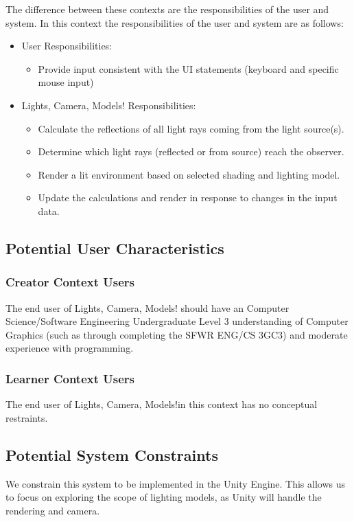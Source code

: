 \documentclass[12pt]{article}
\newcommand{\famname}{Lights, Camera, Models!} %
\begin{document}
The difference between these contexts are the responsibilities of the user and 
system. In this context the responsibilities of the user and system are as 
follows:
\begin{itemize}
	\item User Responsibilities:
	\begin{itemize}
		\item Provide input consistent with the UI statements (keyboard and 
		specific mouse input)
	\end{itemize}
	\item \famname{} Responsibilities:
	\begin{itemize}
		\item Calculate the reflections of all light rays coming from the light 
		source(s).
		\item Determine which light rays (reflected or from source) reach the 
		observer.
		\item Render a lit environment based on selected shading and lighting 
		model.
		\item Update the calculations and render in response to changes in the 
		input data.
	\end{itemize}
\end{itemize}

\subsection{Potential User Characteristics} \label{SecUserCharacteristics}
\subsubsection{Creator Context Users}
The end user of \famname{} should have an Computer Science/Software Engineering 
Undergraduate Level 3 understanding of Computer Graphics (such as through 
completing the SFWR ENG/CS 3GC3) and moderate experience with programming.

\subsubsection{Learner Context Users}
The end user of \famname in this context has no conceptual restraints.

\subsection{Potential System Constraints}
\label{sec:Constraints}
We constrain this system to be implemented in the Unity Engine.
This allows us to focus on exploring the scope of lighting models, as Unity 
will handle the rendering and camera.
\end{document}
